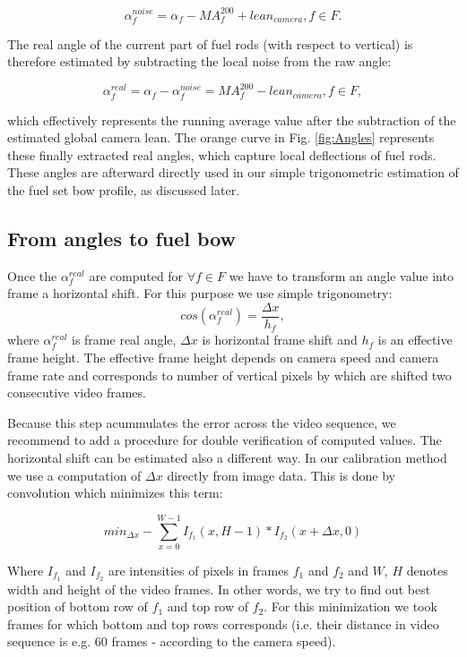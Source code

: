 \documentclass[preprint,12pt]{elsarticle}
\begin{document}
\[\alpha_f^{noise} = \alpha_f - MA_f^{200} + lean_{camera}, f \in F. \]

The real angle of the current part of fuel rods (with respect to vertical) is therefore estimated by subtracting the local noise from the raw angle:

\[\alpha_f^{real} = \alpha_f - \alpha_f^{noise} = MA_f^{200} - lean_{camera}, f \in F, \]

which effectively represents the running average value after the subtraction of the estimated global camera lean. The orange curve in Fig. \ref{fig:Angles} represents these finally extracted real angles, which capture local deflections of fuel rods. These angles are afterward directly used in our simple trigonometric estimation of the fuel set bow profile, as discussed later.

\subsection{From angles to fuel bow}

Once the $\alpha^{real}_f$ are computed for $\forall f \in F$ we have to transform an angle value into frame a horizontal shift. For this purpose we use simple trigonometry:
$$
cos(\alpha_f^{real}) = \frac{\Delta x}{h_f},
$$
where $\alpha_f^{real}$ is frame real angle, $\Delta x$ is horizontal frame shift and $h_f$ is an effective frame height. The effective frame height depends on camera speed and camera frame rate and corresponds to number of vertical pixels by which are shifted two consecutive video frames.

Because this step acummulates the error across the video sequence, we recommend to add a procedure for double verification of computed values. The horizontal shift can be estimated also a different way. In our calibration method we use a computation of $\Delta x$ directly from image data. This is done by convolution which minimizes this term:

$$
min_{\Delta x} -\sum_{x=0}^{W-1}I_{f_1}(x, H-1) * I_{f_2}(x + \Delta x, 0)
$$

Where $I_{f_1}$ and $I_{f_2}$ are intensities of pixels in frames $f_1$ and $f_2$ and $W$, $H$ denotes width and height of the video frames. In other words, we try to find out best position of bottom row of $f_1$ and top row of $f_2$. For this minimization we took frames for which bottom and top rows corresponds (i.e. their distance in video sequence is e.g. 60 frames - according to the camera speed).
\end{document}
